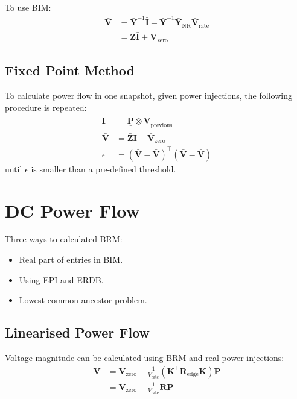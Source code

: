 \documentclass[
]{book}
\providecommand{\tightlist}{%
  \setlength{\itemsep}{0pt}\setlength{\parskip}{0pt}}
\begin{document}
To use BIM:
\[ \begin{aligned}
    \boldsymbol{\bar{V}}
    &= \boldsymbol{\bar{Y}}^{-1} \boldsymbol{\bar{I}}
      - \boldsymbol{\bar{Y}}^{-1} \boldsymbol{\bar{Y}}_\text{NR}
      \boldsymbol{\bar{V}}_\text{rate} \\
    &= \boldsymbol{\bar{Z}} \boldsymbol{\bar{I}}
      + \boldsymbol{\bar{V}}_\text{zero}
\end{aligned} \]

\hypertarget{fixed-point-method}{%
\section{Fixed Point Method}\label{fixed-point-method}}

To calculate power flow in one snapshot, given power injections, the following
procedure is repeated:
\[ \begin{aligned}
    \boldsymbol{\bar{I}} &= \boldsymbol{\underline{P}}
      \otimes \boldsymbol{\underline{V}}_\text{previous} \\
    \boldsymbol{\bar{V}}
    &= \boldsymbol{\bar{Z}} \boldsymbol{\bar{I}}
      + \boldsymbol{\bar{V}}_\text{zero} \\
    \epsilon
    &= \left( \boldsymbol{\bar{V}} - \boldsymbol{\bar{V}} \right)^\top
      \left( \boldsymbol{\bar{V}} - \boldsymbol{\bar{V}} \right)
\end{aligned} \]
until \(\epsilon\) is smaller than a pre-defined threshold.

\hypertarget{dc-power-flow}{%
\chapter{DC Power Flow}\label{dc-power-flow}}

Three ways to calculated BRM:

\begin{itemize}
\tightlist
\item
  Real part of entries in BIM.
\item
  Using EPI and ERDB.
\item
  Lowest common ancestor problem.
\end{itemize}

\hypertarget{linearised-power-flow}{%
\section{Linearised Power Flow}\label{linearised-power-flow}}

Voltage magnitude can be calculated using BRM and real power injections:
\[ \begin{aligned}
  \boldsymbol{V} &= \boldsymbol{V}_\text{zero} + \frac{1}{V_\text{rate}}
    \left(
      \boldsymbol{K}^{\top} \boldsymbol{R}_\text{edge} \boldsymbol{K}
    \right) \boldsymbol{P} \\
  {} &= \boldsymbol{V}_\text{zero}
      + \frac{1}{V_\text{rate}} \boldsymbol{R} \boldsymbol{P}
\end{aligned} \]
\end{document}
